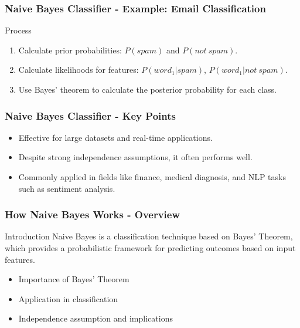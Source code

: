 \documentclass[aspectratio=169]{beamer}
\begin{document}
\begin{frame}[fragile]
    \frametitle{Naive Bayes Classifier - Example: Email Classification}
    \begin{block}{Process}
        \begin{enumerate}
            \item Calculate prior probabilities: \( P(spam) \) and \( P(not \ spam) \).
            \item Calculate likelihoods for features: \( P(word_1 | spam) \), \( P(word_1 | not \ spam) \).
            \item Use Bayes' theorem to calculate the posterior probability for each class.
        \end{enumerate}
    \end{block}
\end{frame}

\begin{frame}[fragile]
    \frametitle{Naive Bayes Classifier - Key Points}
    \begin{itemize}
        \item Effective for large datasets and real-time applications.
        \item Despite strong independence assumptions, it often performs well.
        \item Commonly applied in fields like finance, medical diagnosis, and NLP tasks such as sentiment analysis.
    \end{itemize}
\end{frame}

\begin{frame}[fragile]
    \frametitle{How Naive Bayes Works - Overview}
    \begin{block}{Introduction}
        Naive Bayes is a classification technique based on Bayes' Theorem, which provides a probabilistic framework for predicting outcomes based on input features.
    \end{block}
    \begin{itemize}
        \item Importance of Bayes' Theorem
        \item Application in classification
        \item Independence assumption and implications
    \end{itemize}
\end{frame}
\end{document}
